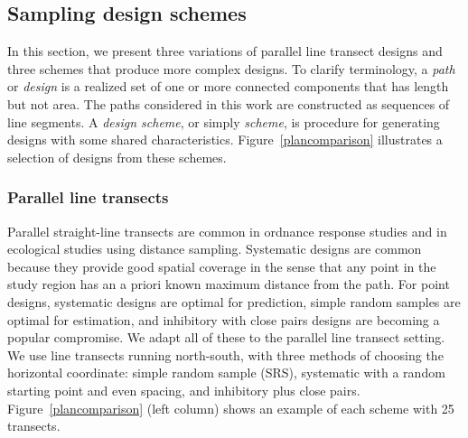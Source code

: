\documentclass[review]{elsarticle}
\begin{document}
\subsection{Sampling design schemes}
\label{methodschemes}

In this section, we present three variations of parallel line transect designs
and three schemes that produce more complex designs. To clarify terminology, a
\emph{path} or \emph{design} is a realized set of one or more connected
components that has length but not area. The paths considered in this work are
constructed as sequences of line segments. A \emph{design scheme}, or simply
\emph{scheme}, is procedure for generating designs with some shared
characteristics. Figure~\ref{plancomparison} illustrates a selection of designs
from these schemes.


\subsubsection{Parallel line transects}

Parallel straight-line transects are common in ordnance response studies and in
ecological studies using distance sampling. Systematic designs are common
because they provide good spatial coverage in the sense that any point in the
study region has an a priori known maximum distance from the path. For point
designs, systematic designs are optimal for prediction, simple random samples
are optimal for estimation, and inhibitory with close pairs designs are
becoming a popular compromise. We adapt all of these to the parallel line
transect setting. We use line transects running north-south, with three methods
of choosing the horizontal coordinate: simple random sample (SRS), systematic
with a random starting point and even spacing, and inhibitory plus close pairs.
Figure~\ref{plancomparison} (left column) shows an example of each scheme with
25 transects.

\end{document}
